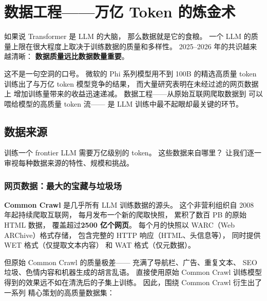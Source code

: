 \chapter{数据工程——万亿 Token 的炼金术}
\label{ch:data}

如果说 Transformer 是 LLM 的大脑，
那么数据就是它的食粮。
一个 LLM 的质量上限在很大程度上取决于训练数据的质量和多样性。
2025--2026 年的共识越来越清晰：
\textbf{数据质量远比数据数量重要}。

这不是一句空洞的口号。
微软的 Phi 系列模型用不到 100B 的精选高质量 token
训练出了与万亿 token 模型竞争的结果，
而大量研究表明在未经过滤的网页数据上
增加训练量带来的收益迅速递减。
数据工程——从原始互联网爬取数据到
可以喂给模型的高质量 token 流——
是 LLM 训练中最不起眼却最关键的环节。

\section{数据来源}

训练一个 frontier LLM 需要万亿级别的 token。
这些数据来自哪里？
让我们逐一审视每种数据来源的特性、规模和挑战。

\subsection{网页数据：最大的宝藏与垃圾场}

\textbf{Common Crawl} 是几乎所有 LLM 训练数据的源头。
这个非营利组织自 2008 年起持续爬取互联网，
每月发布一个新的爬取快照，
累积了数百 PB 的原始 HTML 数据，
覆盖超过\textbf{2500 亿个网页}。
每个月的快照以 WARC（Web ARChive）格式存储，
包含完整的 HTTP 响应（HTML、头信息等），
同时提供 WET 格式（仅提取文本内容）
和 WAT 格式（仅元数据）。

但原始 Common Crawl 的质量极差——
充满了导航栏、广告、重复文本、
SEO 垃圾、色情内容和机器生成的胡言乱语。
直接使用原始 Common Crawl 训练模型
得到的效果远不如在清洗后的子集上训练。
因此，围绕 Common Crawl 衍生出了一系列
精心策划的高质量数据集：


